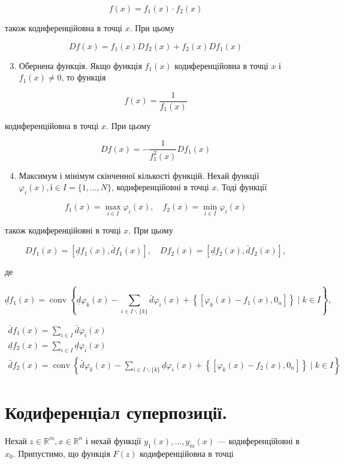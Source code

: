 \documentclass[12pt,a4paper]{extarticle}
\numberwithin{section}{part}
\begin{document}
$$
f(x)=f_{1}(x) \cdot f_{2}(x)
$$

також кодиференційовна в точці $x$. При цьому

$$
D f(x)=f_{1}(x) D f_{2}(x)+f_{2}(x) D f_{1}(x)
$$

\begin{enumerate}
  \setcounter{enumi}{2}
  \item Обернена функція. Якщо функція $f_{1}(x)$ кодиференційовна в точці $x$ і $f_{1}(x) \neq 0$, то функція
\end{enumerate}

$$
f(x)=\frac{1}{f_{1}(x)}
$$

кодиференційовна в точці $x$. При цьому

$$
D f(x)=-\frac{1}{f_{1}^{2}(x)} D f_{1}(x)
$$

\begin{enumerate}
  \setcounter{enumi}{3}
  \item Максимум і мінімум скінченної кількості функцій. Нехай функції $\varphi_{i}(x), і \in I= \{1, \ldots, N\}$, кодиференційовні в точці $x$. Тоді функції
\end{enumerate}

$$
f_{1}(x)=\max _{i \in I} \varphi_{i}(x), \quad f_{2}(x)=\min _{i \in I} \varphi_{i}(x)
$$

також кодиференційовні в точці $x$. При цьому

$$
D f_{1}(x)=\left[\underline{d} f_{1}(x), \bar{d} f_{1}(x)\right], \quad D f_{2}(x)=\left[\underline{d} f_{2}(x), \bar{d} f_{2}(x)\right],
$$

де

$$
\underline{d} f_{1}(x)=\operatorname{conv}\left\{\underline{d} \varphi_{k}(x)-\sum_{i \in I \backslash\{k\}} \bar{d} \varphi_{i}(x)+\left\{\left[\varphi_{k}(x)-f_{1}(x), 0_{n}\right]\right\} \mid k \in I\right\},
$$

$$
\begin{gathered}
\bar{d} f_{1}(x)=\sum_{i \in I} \bar{d} \varphi_{i}(x) \\
\underline{d} f_{2}(x)=\sum_{i \in I} \underline{d} \varphi_{i}(x) \\
\bar{d} f_{2}(x)=\operatorname{conv}\left\{\bar{d} \varphi_{k}(x)-\sum_{i \in I \backslash\{k\}} \underline{d} \varphi_{i}(x)+\left\{\left[\varphi_{k}(x)-f_{2}(x), 0_{n}\right]\right\} \mid k \in I\right\}
\end{gathered}
$$

\section{Кодиференціал суперпозиції.}
Нехай $z \in \mathbb{R}^{m}, x \in \mathbb{R}^{n}$ і нехай функції $y_{1}(x), \ldots, y_{m}(x)$ --- кодиференційовні в $x_{0}$. Припустимо, що функція $F(z)$ кодиференційовна в точці
\end{document}
